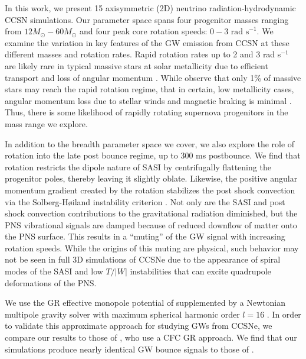 \documentclass[twocolumn,times]{aastex62}  %
\begin{document}
In this work, we present 15 axisymmetric (2D) neutrino radiation-hydrodynamic CCSN simulations.  
Our parameter space spans four progenitor masses ranging from $12M_\odot-60M_\odot$ \citep{Suk:2016} and four peak core rotation speeds: $0-3 \text{ rad s}^{-1}$.  
We examine the variation in key features of the GW emission from CCSN at these different masses and rotation rates.
Rapid rotation rates up to 2 and 3 rad s$^{-1}$ are likely rare in typical massive stars at solar metallicity due to efficient transport and loss of angular momentum \citep{heger:2005}.
While \citet{woosley:2006} observe that only 1\% of massive stars may reach the rapid rotation regime, that in certain, low metallicity cases, angular momentum loss due to stellar winds and magnetic braking is minimal \citep{yoon:2005}.  Thus, there is some likelihood of rapidly rotating supernova progenitors in the mass range we explore.  



In addition to the breadth parameter space we cover, we also explore the role of rotation into the late post bounce regime, up to 300 ms postbounce.  
We find that rotation restricts the dipole nature of SASI by centrifugally flattening the progenitor poles, thereby leaving it slightly oblate. Likewise, the positive angular momentum gradient created by the rotation stabilizes the post shock convection via the Solberg-H{\o}iland instability criterion \citep{endal:1978,fryer:2000}.  Not only are the SASI and post shock convection contributions to the gravitational radiation diminished, but the PNS vibrational signals are damped because of reduced downflow of matter onto the PNS surface.  
This results in a ``muting'' of the GW signal with increasing rotation speeds.
While the origins of this muting are physical, such behavior may not be seen in full 3D simulations of CCSNe due to the appearance of spiral modes of the SASI and low $T/|W|$ instabilities that can excite quadrupole deformations of the PNS. 

We use the GR effective monopole potential of \citet{marek:2006} supplemented by a Newtonian multipole gravity solver with maximum spherical harmonic order $l=16$ \citep{couch:2013a, oconnor:2018}.
In order to validate this approximate approach for studying GWs from CCSNe, we compare our results to those of \citet{richers:2017}, who use a CFC GR approach.  We find that our simulations produce nearly identical GW bounce signals to those of \citet{richers:2017}.  
\end{document}
